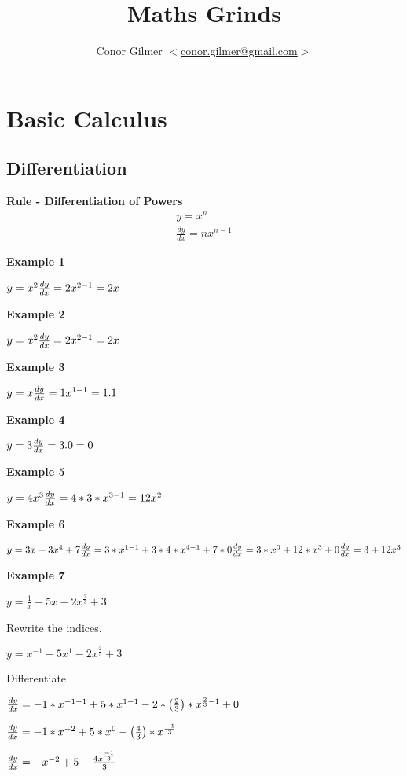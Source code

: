 \documentclass{article}
\title{\gmat{} Maths Grinds}
\author{Conor Gilmer $<$\href{mailto:conor.gilmer@gmail.com}{conor.gilmer@gmail.com}$>$}
\begin{document}
\section{Basic Calculus}
\subsection{Differentiation}
\textbf{Rule - Differentiation of Powers}
\begin{equation}
\begin{split}
y = x^{n} \\
\frac{dy}{dx} = nx^{n-1}
\end{split}
\end{equation}




\textbf{Example 1}

$y = x^{2}\\
\frac{dy}{dx} = 2x^{2-1} = 2x
$


\textbf{Example 2}

$y = x^{2}\\
\frac{dy}{dx} = 2x^{2-1} = 2x
$


\textbf{Example 3}

$y = x\\
\frac{dy}{dx} = 1x^{1-1} = 1.1
$

\textbf{Example 4}

$y = 3\\
\frac{dy}{dx} = 3.0 = 0
$

\textbf{Example 5}

$y = 4x^{3}\\
\frac{dy}{dx} = 4*3*x^{3-1} = 12x^{2}
$


\textbf{Example 6}

$y = 3x + 3x^{4} + 7\\
\frac{dy}{dx} = 3*x^{1-1} + 3*4*x^{4-1} + 7 * 0 \\
\frac{dy}{dx} = 3*x^{0} + 12*x^{3} + 0\\
\frac{dy}{dx} = 3 + 12x^{3} \\
$

\textbf{Example 7}

$y = \frac{1}{x} + 5x - 2x^{\frac{2}{3}} + 3$

Rewrite the indices.

$y = x^{-1} +  5x^{1} - 2x^{\frac{2}{3}} + 3$

Differentiate

$\frac{dy}{dx} = -1*x^{-1-1} +5*x^{1-1} - 2 * \left(\frac{2}{3}\right) * x^{\frac{2}{3} - 1}   + 0 \\
$

$\frac{dy}{dx} = -1*x^{-2} +5*x^{0} -  \left(\frac{4}{3}\right) * x^{\frac{-1}{3}}  \\
$

$\frac{dy}{dx} = -x^{-2} + 5 -  \frac{4x^{\frac{-1}{3}}}{3}  \\
$
\end{document}

